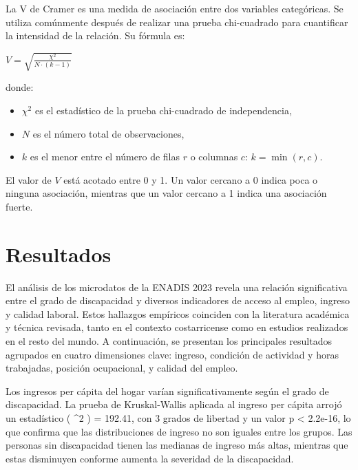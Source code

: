 \documentclass[
  11pt,
  oneside]{article}
\begin{document}
\begin{tcolorbox}[title=V de Cramer]
La V de Cramer es una medida de asociación entre dos variables categóricas. Se utiliza comúnmente después de realizar una prueba chi-cuadrado para cuantificar la intensidad de la relación. Su fórmula es:

\begin{center}
$V = \sqrt{ \frac{\chi^2}{N \cdot (k - 1)} }$
\end{center}

donde:

\begin{itemize}
  \item \( \chi^2 \) es el estadístico de la prueba chi-cuadrado de independencia,  
  \item \( N \) es el número total de observaciones,  
  \item \( k \) es el menor entre el número de filas \( r \) o columnas \( c \): \( k = \min(r, c) \).
\end{itemize}

El valor de \( V \) está acotado entre 0 y 1. Un valor cercano a 0 indica poca o ninguna asociación, mientras que un valor cercano a 1 indica una asociación fuerte.
\end{tcolorbox}

\section{Resultados}\label{resultados}

El análisis de los microdatos de la ENADIS 2023 revela una relación
significativa entre el grado de discapacidad y diversos indicadores de
acceso al empleo, ingreso y calidad laboral. Estos hallazgos empíricos
coinciden con la literatura académica y técnica revisada, tanto en el
contexto costarricense como en estudios realizados en el resto del
mundo. A continuación, se presentan los principales resultados agrupados
en cuatro dimensiones clave: ingreso, condición de actividad y horas
trabajadas, posición ocupacional, y calidad del empleo.

Los ingresos per cápita del hogar varían significativamente según el
grado de discapacidad. La prueba de Kruskal-Wallis aplicada al ingreso
per cápita arrojó un estadístico ( \chi\^{}2 ) = 192.41, con 3 grados de
libertad y un valor p \textless{} 2.2e-16, lo que confirma que las
distribuciones de ingreso no son iguales entre los grupos. Las personas
sin discapacidad tienen las medianas de ingreso más altas, mientras que
estas disminuyen conforme aumenta la severidad de la discapacidad.
\end{document}
